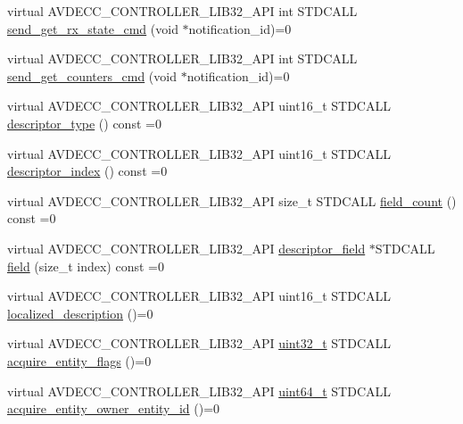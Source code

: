 \begin{DoxyCompactItemize}
\item 
virtual A\+V\+D\+E\+C\+C\+\_\+\+C\+O\+N\+T\+R\+O\+L\+L\+E\+R\+\_\+\+L\+I\+B32\+\_\+\+A\+PI int S\+T\+D\+C\+A\+LL \hyperlink{classavdecc__lib_1_1stream__input__descriptor_a7d6da6754f8090e30071f19b30ff8bb1}{send\+\_\+get\+\_\+rx\+\_\+state\+\_\+cmd} (void $\ast$notification\+\_\+id)=0
\item 
virtual A\+V\+D\+E\+C\+C\+\_\+\+C\+O\+N\+T\+R\+O\+L\+L\+E\+R\+\_\+\+L\+I\+B32\+\_\+\+A\+PI int S\+T\+D\+C\+A\+LL \hyperlink{classavdecc__lib_1_1stream__input__descriptor_ab657b0af297908406798934243812b7c}{send\+\_\+get\+\_\+counters\+\_\+cmd} (void $\ast$notification\+\_\+id)=0
\item 
virtual A\+V\+D\+E\+C\+C\+\_\+\+C\+O\+N\+T\+R\+O\+L\+L\+E\+R\+\_\+\+L\+I\+B32\+\_\+\+A\+PI uint16\+\_\+t S\+T\+D\+C\+A\+LL \hyperlink{classavdecc__lib_1_1descriptor__base_a5112b70022171063ec5d3242bee9910e}{descriptor\+\_\+type} () const =0
\item 
virtual A\+V\+D\+E\+C\+C\+\_\+\+C\+O\+N\+T\+R\+O\+L\+L\+E\+R\+\_\+\+L\+I\+B32\+\_\+\+A\+PI uint16\+\_\+t S\+T\+D\+C\+A\+LL \hyperlink{classavdecc__lib_1_1descriptor__base_a7eed5583bffdf72d89021b188648c1b5}{descriptor\+\_\+index} () const =0
\item 
virtual A\+V\+D\+E\+C\+C\+\_\+\+C\+O\+N\+T\+R\+O\+L\+L\+E\+R\+\_\+\+L\+I\+B32\+\_\+\+A\+PI size\+\_\+t S\+T\+D\+C\+A\+LL \hyperlink{classavdecc__lib_1_1descriptor__base_ab1edf4996377ed957088a7b3b16aca7d}{field\+\_\+count} () const =0
\item 
virtual A\+V\+D\+E\+C\+C\+\_\+\+C\+O\+N\+T\+R\+O\+L\+L\+E\+R\+\_\+\+L\+I\+B32\+\_\+\+A\+PI \hyperlink{classavdecc__lib_1_1descriptor__field}{descriptor\+\_\+field} $\ast$S\+T\+D\+C\+A\+LL \hyperlink{classavdecc__lib_1_1descriptor__base_aa3716832eed0b6f6dcfba358c5d2c601}{field} (size\+\_\+t index) const =0
\item 
virtual A\+V\+D\+E\+C\+C\+\_\+\+C\+O\+N\+T\+R\+O\+L\+L\+E\+R\+\_\+\+L\+I\+B32\+\_\+\+A\+PI uint16\+\_\+t S\+T\+D\+C\+A\+LL \hyperlink{classavdecc__lib_1_1descriptor__base_a1fb9de45567df344090a1407aa6b775f}{localized\+\_\+description} ()=0
\item 
virtual A\+V\+D\+E\+C\+C\+\_\+\+C\+O\+N\+T\+R\+O\+L\+L\+E\+R\+\_\+\+L\+I\+B32\+\_\+\+A\+PI \hyperlink{parse_8c_a6eb1e68cc391dd753bc8ce896dbb8315}{uint32\+\_\+t} S\+T\+D\+C\+A\+LL \hyperlink{classavdecc__lib_1_1descriptor__base_a42f2a796375edd05c8d29856c018042d}{acquire\+\_\+entity\+\_\+flags} ()=0
\item 
virtual A\+V\+D\+E\+C\+C\+\_\+\+C\+O\+N\+T\+R\+O\+L\+L\+E\+R\+\_\+\+L\+I\+B32\+\_\+\+A\+PI \hyperlink{parse_8c_aec6fcb673ff035718c238c8c9d544c47}{uint64\+\_\+t} S\+T\+D\+C\+A\+LL \hyperlink{classavdecc__lib_1_1descriptor__base_a6480d803970d505ce7a9b429a6eb71bd}{acquire\+\_\+entity\+\_\+owner\+\_\+entity\+\_\+id} ()=0

\end{DoxyCompactItemize}

